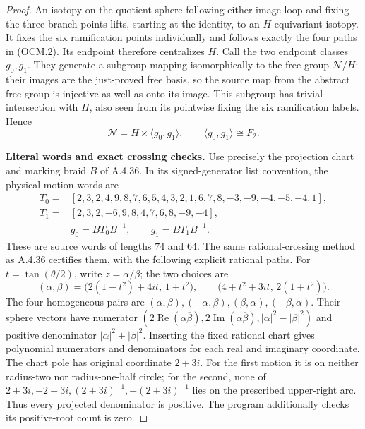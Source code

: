 \begin{proof}
An isotopy on the quotient sphere following either
image loop and fixing the three branch points lifts,
starting at the identity, to an $H$-equivariant isotopy.
It fixes the six ramification points individually and
follows exactly the four paths in (OCM.2).
Its endpoint therefore centralizes $H$.
Call the two endpoint classes $g_0,g_1$.
They generate a subgroup mapping isomorphically to
the free group $\mathcal N/H$: their images are the
just-proved free basis, so the source map from the
abstract free group is injective as well as onto its
image.  This subgroup has trivial intersection with
$H$, also seen from its pointwise fixing the six
ramification labels.  Hence
\[
           \mathcal N=H\times\langle g_0,g_1\rangle,
                 \qquad \langle g_0,g_1\rangle\cong F_2.
                                                               \tag{OCM.5}
\]

\par\medskip\noindent\textbf{Literal words and exact crossing checks.}\quad
Use precisely the projection chart and marking braid
$B$ of A.4.36.  In its signed-generator list convention,
the physical motion words are
\[
\begin{aligned}
 T_0={}&[2,3,2,4,9,8,7,6,5,4,3,2,1,6,7,8,
                              -3,-9,-4,-5,-4,1],\\
 T_1={}&[2,3,2,-6,9,8,4,7,6,8,-9,-4],\\
       &g_0=B T_0 B^{-1},\qquad g_1=B T_1 B^{-1}.
\end{aligned}                                                   \tag{OCM.6}
\]
These are source words of lengths $74$ and $64$.
The same rational-crossing method as A.4.36 certifies
them, with the following explicit rational paths.
For $t=\tan(\theta/2)$, write $z=\alpha/\beta$;
the two choices are
\[
 (\alpha,\beta)
  =\bigl(2(1-t^2)+4it,\,1+t^2\bigr),\qquad
  \bigl(4+t^2+3it,\,2(1+t^2)\bigr).
                                                               \tag{OCM.7}
\]
The four homogeneous pairs are
$(\alpha,\beta),(-\alpha,\beta),(\beta,\alpha),(-\beta,\alpha)$.
Their sphere vectors have numerator
$(2\operatorname{Re}(\alpha\overline\beta),
  2\operatorname{Im}(\alpha\overline\beta),
  |\alpha|^2-|\beta|^2)$ and positive denominator
$|\alpha|^2+|\beta|^2$.
Inserting the fixed rational chart gives polynomial
numerators and denominators for each real and imaginary
coordinate.
The chart pole has original coordinate $2+3i$.
For the first motion it is on neither radius-two nor
radius-one-half circle; for the second, none of
$2+3i,-2-3i,(2+3i)^{-1},-(2+3i)^{-1}$
lies on the prescribed upper-right arc.
Thus every projected denominator is positive.
The program additionally checks its positive-root
count is zero.


\end{proof}
